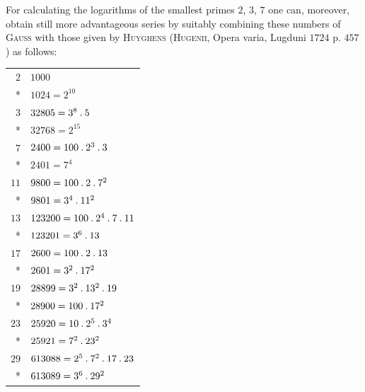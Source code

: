 For calculating the logarithms of the smallest primes $2$, $3$, $7$ one can, moreover, obtain still more advantageous series by suitably combining these numbers of \textsc{Gauss} with those given by \textsc{Huyghens} (\textsc{Hugenii}, Opera varia, Lugduni $1724$ p. $457$) as follows:
\begingroup\renewcommand{\arraystretch}{1.15}
\begin{longtable}{@{}rl@{}}
$2$ & $1000$\\*
 & $1024=2^{10}$\\
$3$ & $32805=3^8\mathbin{.} 5$\\*
 & $32768=2^{15}$\\
$7$ & $2400=100\mathbin{.} 2^3\mathbin{.} 3$\\*
 & $2401=7^4$\\
$11$ & $9800=100\mathbin{.} 2\mathbin{.} 7^2$\\*
 & $9801=3^4\mathbin{.} 11^2$\\
$13$ & $123200=100\mathbin{.} 2^4\mathbin{.} 7\mathbin{.} 11$\\*
 & $123201=3^6\mathbin{.} 13$\\
$17$ & $2600=100\mathbin{.} 2\mathbin{.} 13$\\*
 & $2601=3^2\mathbin{.} 17^2$\\
$19$ & $28899=3^2\mathbin{.} 13^2\mathbin{.} 19$\\*
 & $28900=100\mathbin{.} 17^2$\\
$23$ & $25920=10\mathbin{.} 2^5\mathbin{.} 3^4$\\*
 & $25921=7^2\mathbin{.} 23^2$\\
$29$ & $613088=2^5\mathbin{.} 7^2\mathbin{.} 17\mathbin{.} 23$\\*
 & $613089=3^6\mathbin{.} 29^2$\\
\end{longtable}\endgroup
